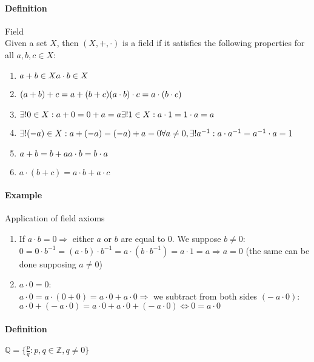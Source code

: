 \documentclass{article}
\newcommand{\Z}{\mathbb{Z}}
\newcommand{\Q}{\mathbb{Q}}
\newcommand{\Def}{\paragraph{Definition}}
\newcommand{\Example}{\paragraph{Example}}
\begin{document}
	\Def Field
\\Given a set $X$, then $(X, +, \cdot)$ is a field if it satisfies the following
	properties for all $a, b, c \in X$:
	\begin{enumerate}[label=(\roman*)]
		\item
		$a + b \in X
	\\a \cdot b \in X$

		\item
		$(a + b) + c = a + (b + c)
	\\(a \cdot b) \cdot c = a \cdot (b \cdot c)$

		\item
		$\exists! 0 \in X : a + 0 = 0 + a = a
	\\\exists! 1 \in X : a \cdot 1 = 1 \cdot a = a$

		\item
		$\exists! (-a) \in X : a + (-a) = (-a) + a = 0
	\\\forall a \neq 0, \exists! a^{-1} : a \cdot a^{-1} = a^{-1} \cdot a = 1$

		\item
		$a + b = b + a
	\\a \cdot b = b\cdot a$

		\item
		$a \cdot (b + c) = a \cdot b + a \cdot c$
	\end{enumerate}

	\Example Application of field axioms
	\begin{enumerate}[label=(\arabic*)]
		\item If $a \cdot b = 0 \Rightarrow$ either $a$ or $b$ are equal to 0. We
		suppose $b \neq 0$:
	\\$0 = 0 \cdot b^{-1} = (a \cdot b) \cdot b^{-1} = a \cdot (b \cdot b^{-1}) =
		a \cdot 1 = a \Rightarrow a = 0$ (the same can be done supposing $a \neq 0$)

		\item $a \cdot 0 = 0$:
	\\$a \cdot 0 = a \cdot (0 + 0) = a \cdot 0 + a \cdot 0 \Rightarrow$ we
		subtract from both sides $(- \ a \cdot 0)$:
	\\$a \cdot 0 + (- \ a \cdot 0) = a \cdot 0 + a \cdot 0 + (- \ a \cdot 0) \iff
		0 = a \cdot 0$
	\end{enumerate}

	\Def $\Q = \{ \frac{p}{q} : p, q \in \Z, q \neq 0 \}$
\end{document}
